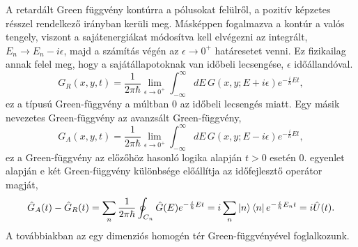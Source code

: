 A retardált Green függvény kontúrra a pólusokat felülről, a pozitív képzetes résszel rendelkező irányban kerüli meg. Másképpen fogalmazva a kontúr a valós tengely, viszont a sajátenergiákat módosítva kell elvégezni az integrált, $E_n\to E_n-i\epsilon$, majd a számítás végén az $\epsilon\to 0^+$ határesetet venni. Ez fizikailag annak felel meg, hogy a sajátállapotoknak van időbeli lecsengése, $\epsilon$ időállandóval.
\begin{equation}
	G_R(x,y,t)=\frac{1}{2\pi\hbar}\lim_{\epsilon\to 0^+}\int_{-\infty}^{\infty}dE\,G(x,y;E+i\epsilon)e^{-\frac{i}{\hbar}Et},
\end{equation}
ez a típusú Green-függvény a múltban $0$ az időbeli lecsengés miatt. Egy másik nevezetes Green-függvény az avanzsált Green-függvény,
\begin{equation}
	G_A(x,y,t)=\frac{1}{2\pi\hbar}\lim_{\epsilon\to 0^+}\int_{-\infty}^{\infty}dE\,G(x,y;E-i\epsilon)e^{-\frac{i}{\hbar}Et},
\end{equation}
ez a Green-függvény az előzőhöz hasonló logika alapján $t>0$ esetén $0$.  egyenlet alapján e két Green-függvény különbsége előállítja az időfejlesztő operátor magját,
\begin{equation}
	\hat{G}_A(t)-\hat{G}_R(t)=\sum_n\frac{1}{2\pi\hbar}\oint_{C_n}\hat{G}(E)e^{-\frac{i}{\hbar}Et}=i\sum_n\Ket{n}\Bra{n}e^{-\frac{i}{\hbar}E_nt}=i\hat{U}(t).
\end{equation}
A továbbiakban az egy dimenziós homogén tér Green-függvényével foglalkozunk.







